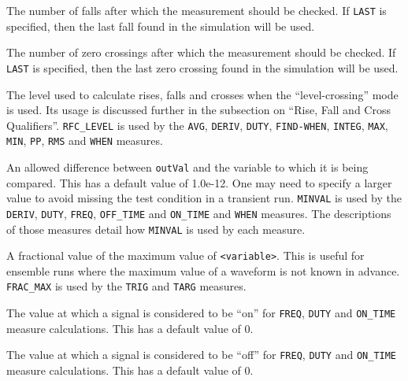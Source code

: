 \begin{Command}
\begin{Arguments}

The number of falls after which the measurement should be checked.  If
\texttt{LAST} is specified, then the last fall found in the simulation
will be used.


The number of zero crossings after which the measurement should be
checked.  If \texttt{LAST} is specified, then the last zero crossing
found in the simulation will be used.


The level used to calculate rises, falls and crosses when the
``level-crossing'' mode is used.  Its usage is discussed further 
in the subsection on ``Rise, Fall and Cross Qualifiers''.  
{\tt RFC\_LEVEL} is used by the {\tt AVG}, {\tt DERIV}, {\tt DUTY}, 
{\tt FIND-WHEN}, {\tt INTEG}, {\tt MAX}, {\tt MIN}, {\tt PP},
{\tt RMS} and {\tt WHEN} measures. 


An allowed difference between \texttt{outVal} and the variable
to which it is being compared.  This has a default value of 1.0e-12.
One may need to specify a larger value to avoid missing the test
condition in a transient run.  {\tt MINVAL} is used by the {\tt DERIV}, {\tt DUTY}, 
{\tt FREQ}, {\tt OFF\_TIME} and {\tt ON\_TIME} and {\tt WHEN} measures.  The
descriptions of those measures detail how {\tt MINVAL} is used by each measure.


A fractional value of the maximum value of \texttt{<variable>}.  This is useful for
ensemble runs where the maximum value of a waveform is not known in advance.  
{\tt FRAC\_MAX} is used by the {\tt TRIG} and {\tt TARG} measures.


The value at which a signal is considered to be ``on'' for {\tt FREQ}, {\tt DUTY}
and {\tt ON\_TIME} measure calculations.  This has a default value of 0.


The value at which a signal is considered to be ``off'' for {\tt FREQ}, {\tt DUTY}
and {\tt ON\_TIME} measure calculations.  This has a default value of 0.



\end{Arguments}
\end{Command}
